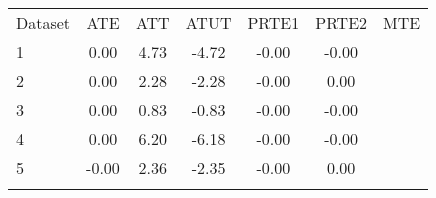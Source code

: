 \begin{center}
\begin{tabular}{lcccccc}
\hline \noalign{\smallskip}Dataset & ATE & ATT & ATUT & PRTE1 & PRTE2 & MTE\\
\noalign{\smallskip}\hline \noalign{\smallskip}1 & 0.00 & 4.73 & -4.72 & -0.00 & -0.00 & \\
2 & 0.00 & 2.28 & -2.28 & -0.00 & 0.00 & \\
3 & 0.00 & 0.83 & -0.83 & -0.00 & -0.00 & \\
4 & 0.00 & 6.20 & -6.18 & -0.00 & -0.00 & \\
5 & -0.00 & 2.36 & -2.35 & -0.00 & 0.00 & \\
\noalign{\smallskip}\hline\end{tabular}\\
\end{center}
